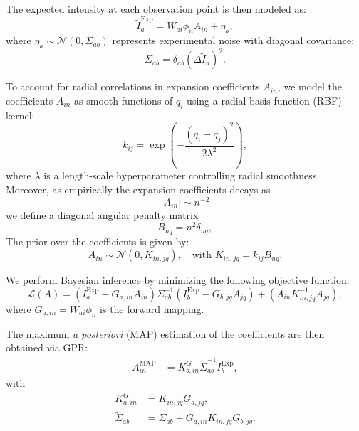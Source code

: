 \documentclass[12pt]{article}
\begin{document}
The expected intensity at each observation point is then modeled as:
\begin{equation}
    \tilde{I}_a^{\mathrm{Exp}} = W_{ai} \phi_{n} A_{in} + \eta_a,
    \label{eq:I_expansion_w}
\end{equation}
where \( \eta_a \sim \mathcal{N}(0, \Sigma_{ab}) \) represents experimental noise with diagonal covariance:
\begin{equation}
    \Sigma_{ab} = \delta_{ab} (\Delta \tilde{I}_a)^2.
    \label{eq:Sigma_ab}
\end{equation}


To account for radial correlations in expansion coefficients \(A_{in}\), we model the coefficients \( A_{in} \) as smooth functions of \( q_i \) using a radial basis function (RBF) kernel:
\begin{equation}
    k_{ij} = \exp\left(-\frac{(q_i - q_j)^2}{2\lambda^2}\right),
\end{equation}
where \( \lambda \) is a length-scale hyperparameter controlling radial smoothness. Moreover, as empirically the expansion coefficients decays as 
\begin{equation}
    \lvert A_{in}\rvert \sim n^{-2}
\end{equation}
we define a diagonal angular penalty matrix
\begin{equation}
    B_{nq} = n^2\delta_{nq},
\end{equation}
The prior over the coefficients is given by:
\begin{equation}
    A_{in} \sim \mathcal{N}(0, K_{in,jq}), \quad \text{with } K_{in,jq} = k_{ij} B_{nq}.
\end{equation}


We perform Bayesian inference by minimizing the following objective function:
\begin{equation}
    \mathcal{L}(A) = (I_a^{\mathrm{Exp}} - G_{a,in} A_{in}) \Sigma_{ab}^{-1} (I_b^{\mathrm{Exp}} - G_{b,jq} A_{jq}) + (A_{in} K_{in,jq}^{-1}A_{jq}),
\end{equation}
where \( G_{a,in} = W_{ai} \phi_{n} \) is the forward mapping.

The maximum \textit{a posteriori} (MAP) estimation of the coefficients are then obtained via GPR:
\begin{align}
    A_{in}^{\mathrm{MAP}} &= K^G_{b,in} \tilde{\Sigma}^{-1}_{ab} I_b^{\mathrm{Exp}}, 
\end{align}
with
\begin{align}
    K^G_{a,in} &= K_{in,jq} G_{a,jq}, \\
    \tilde{\Sigma}_{ab} &= \Sigma_{ab} + G_{a,in} K_{in,jq} G_{b,jq}.
\end{align}
\end{document}
